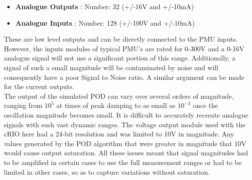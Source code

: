 \documentclass[journal]{IEEEtran}
\begin{document}
\begin{itemize}
\item \textbf{Analogue Outputs} : Number: 32 (+/-16V and +/-10mA)
\item \textbf{Analogue Inputs} : Number: 128 (+/-100V and +/-10mA)
\end{itemize}

These are low level outputs and can be directly connected to the PMU inputs. However, the inputs modules of typical PMU's are rated for 0-300V and a 0-16V analogue signal will not use a significant portion of this range. Additionally, a signal of such a small magnitude will be contaminated by noise and will consequently have a poor Signal to Noise ratio. A similar argument can be made for the current outputs.\\

The output of the simulated POD can vary over several orders of magnitude, ranging from $10^{5}$ at times of peak damping to as small as $10^{-3}$ once the oscillation magnitude  becomes small. It is difficult to accurately recreate analogue signals with such vast dynamic ranges. The voltage output module used with the cRIO here had a 24-bit resolution and was limited to 10V in magnitude. Any values generated by the POD algorithm that were greater in magnitude that 10V would cause output saturation. All these issues meant that signal magnitudes had to be amplified in certain cases to use the full measurement ranges or had to be limited in other cases, so as to capture variations without saturation.\\
\end{document}
